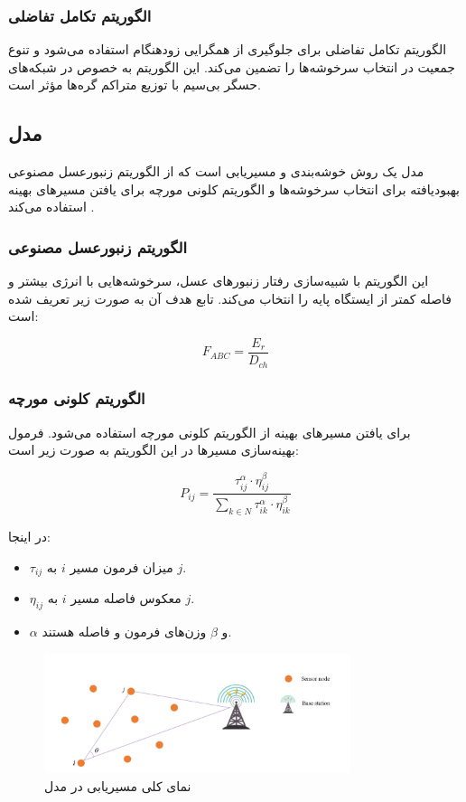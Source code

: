 \documentclass[12pt, onecolumn, a4paper]{article}
\begin{document}
\subsubsection{الگوریتم تکامل تفاضلی}
الگوریتم تکامل تفاضلی برای جلوگیری از همگرایی زودهنگام استفاده می‌شود و تنوع جمعیت در انتخاب سرخوشه‌ها را تضمین می‌کند. این الگوریتم به خصوص در شبکه‌های حسگر بی‌سیم با توزیع متراکم گره‌ها مؤثر است.

\subsection{مدل }
مدل  یک روش خوشه‌بندی و مسیریابی است که از الگوریتم زنبورعسل مصنوعی بهبودیافته برای انتخاب سرخوشه‌ها و الگوریتم کلونی مورچه برای یافتن مسیرهای بهینه استفاده می‌کند \cite{ref6, ref7}.

\subsubsection{الگوریتم زنبورعسل مصنوعی}
این الگوریتم با شبیه‌سازی رفتار زنبورهای عسل، سرخوشه‌هایی با انرژی بیشتر و فاصله کمتر از ایستگاه پایه را انتخاب می‌کند. تابع هدف آن به صورت زیر تعریف شده است:

\begin{equation}
	F_{ABC} = \frac{E_r}{D_{ch}}
\end{equation}

\subsubsection{الگوریتم کلونی مورچه}
برای یافتن مسیرهای بهینه از الگوریتم کلونی مورچه استفاده می‌شود. فرمول بهینه‌سازی مسیرها در این الگوریتم به صورت زیر است:

\begin{equation}
	P_{ij} = \frac{\tau_{ij}^\alpha \cdot \eta_{ij}^\beta}{\sum_{k \in N} \tau_{ik}^\alpha \cdot \eta_{ik}^\beta}
\end{equation}

در اینجا:
\begin{itemize}
	\item $\tau_{ij}$ میزان فرمون مسیر $i$ به $j$.
	\item $\eta_{ij}$ معکوس فاصله مسیر $i$ به $j$.
	\item $\alpha$ و $\beta$ وزن‌های فرمون و فاصله هستند.
\end{itemize}

\begin{figure}[h]
	\centering
	\includegraphics[width=0.8\textwidth]{routing-abc-aco.png}
	\caption{نمای کلی مسیریابی در مدل }
	\label{fig:routing_abc_aco}
\end{figure}
\end{document}
